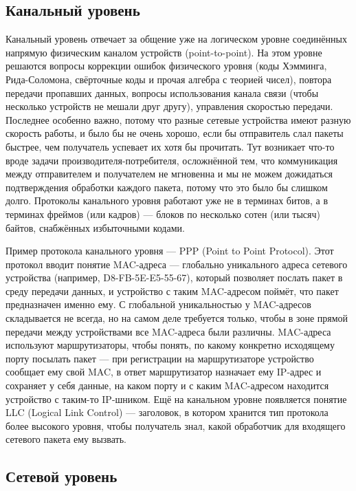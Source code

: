 \documentclass{../../text-style}
\begin{document}
\subsection{Канальный уровень}

Канальный уровень отвечает за общение уже на логическом уровне соединённых напрямую физическим каналом устройств (point-to-point). На этом уровне решаются вопросы коррекции ошибок физического уровня (коды Хэмминга, Рида-Соломона, свёрточные коды и прочая алгебра с теорией чисел), повтора передачи пропавших данных, вопросы использования канала связи (чтобы несколько устройств не мешали друг другу), управления скоростью передачи. Последнее особенно важно, потому что разные сетевые устройства имеют разную скорость работы, и было бы не очень хорошо, если бы отправитель слал пакеты быстрее, чем получатель успевает их хотя бы прочитать. Тут возникает что-то вроде задачи производителя-потребителя, осложнённой тем, что коммуникация между отправителем и получателем не мгновенна и мы не можем дожидаться подтверждения обработки каждого пакета, потому что это было бы слишком долго. Протоколы канального уровня работают уже не в терминах битов, а в терминах фреймов (или кадров) --- блоков по несколько сотен (или тысяч) байтов, снабжённых избыточными кодами.

Пример протокола канального уровня --- PPP (Point to Point Protocol). Этот протокол вводит понятие MAC-адреса --- глобально уникального адреса сетевого устройства (например, D8-FB-5E-E5-55-67), который позволяет послать пакет в среду передачи данных, и устройство с таким MAC-адресом поймёт, что пакет предназначен именно ему. С глобальной уникальностью у MAC-адресов складывается не всегда, но на самом деле требуется только, чтобы в зоне прямой передачи между устройствами все MAC-адреса были различны. MAC-адреса используют маршрутизаторы, чтобы понять, по какому конкретно исходящему порту посылать пакет --- при регистрации на маршрутизаторе устройство сообщает ему свой MAC, в ответ маршрутизатор назначает ему IP-адрес и сохраняет у себя данные, на каком порту и с каким MAC-адресом находится устройство с таким-то IP-шником. Ещё на канальном уровне появляется понятие LLC (Logical Link Control) --- заголовок, в котором хранится тип протокола более высокого уровня, чтобы получатель знал, какой обработчик для входящего сетевого пакета ему вызвать.

\subsection{Сетевой уровень}
\end{document}
